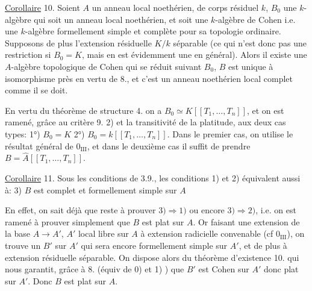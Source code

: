 \uline{Corollaire} 10. Soient $A$ un anneau local noethérien, de corps résiduel
$k$, $B_0$ une $k$-algèbre qui soit un anneau local noethérien, et soit une $k$-algèbre
de Cohen i.e. une $k$-algèbre formellement simple  et complète
pour sa topologie ordinaire. Supposons de plus l'extension résiduelle $K/k$
séparable (ce qui n'est donc pas une restriction si $B_0=K$, mais en est
évidemment une en général). Alors il existe une $A$-algèbre topologique de
Cohen  qui se réduit suivant $B_0$, $B$ est unique à isomorphisme près
en vertu de 8., et c'est un anneau noethérien local complet comme il se doit.

En vertu du théorème de structure 4. on a $B_0\simeq K[[T_1,\ldots,T_n]]$,
et on est ramené, grâce au critère 9. 2) et la transitivité de la
platitude, aux deux cas types: 1°) $B_0=K$ 2°) $B_0=k[[T_1,\ldots,T_n]]$. Dans
le premier cas, on utilise le résultat général de $0_{\mathrm{III}}$, et dans le
deuxième cas il suffit de prendre $B=\widehat{A}[[T_1,\ldots,T_n]]$.

 \uline{Corollaire} 11. Sous les conditions de 3.9.,
les conditions 1) et 2) équivalent aussi à: 3) $B$ est complet et formellement simple sur $A$

En effet, on sait déjà que 
reste à prouver  $3)\Longrightarrow1)$
 ou encore $3)\Longrightarrow2)$, i.e. on est ramené à prouver simplement que
$B$ est plat sur $A$. Or faisant une extension de la base $A\longrightarrow A'$, $A'$ local
libre  sur $A$ à extension radicielle convenable (cf $0_{\mathrm{III}}$), on trouve un $B'$
 sur $A'$ qui sera encore formellement simple sur $A'$, et de plus à extension
résiduelle  séparable. On dispose alors du théorème d'existence
10. qui nous garantit, grâce à 8. (équiv de 0) et 1) ) que $B'$ est
Cohen sur $A'$ donc plat sur $A'$. Donc $B$ est plat sur $A$.



